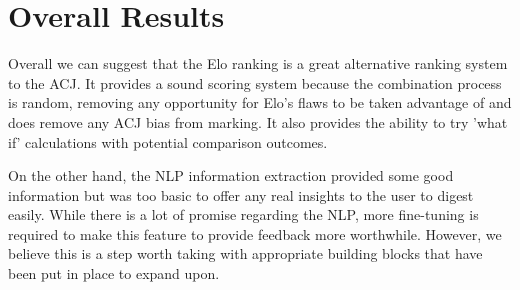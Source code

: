 \section{Overall Results}
\label{sec:reaults_NLP}

	Overall we can suggest that the Elo ranking is a great alternative ranking system to the ACJ. It provides a sound scoring system because the combination process is random, removing any opportunity for Elo's flaws to be taken advantage of and does remove any ACJ bias from marking. It also provides the ability to try 'what if' calculations with potential comparison outcomes.
	
	On the other hand, the NLP information extraction provided some good information but was too basic to offer any real insights to the user to digest easily. While there is a lot of promise regarding the NLP, more fine-tuning is required to make this feature to provide feedback more worthwhile. However, we believe this is a step worth taking with appropriate building blocks that have been put in place to expand upon.

